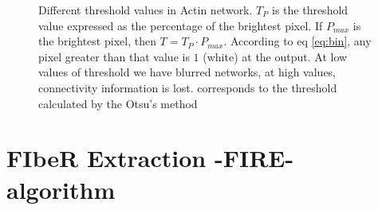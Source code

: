 \begin{figure}[h]
\begin{minipage}{0.55\textwidth}
\hspace{1pt}
\end{minipage}
% 
% 
\caption[Different threshold values on networks]{Different threshold values in
Actin network.
$T_P$ is the threshold value expressed as the percentage of the brightest pixel. If
$P_{max}$ is the brightest pixel, then $T=T_P\cdot P_{max}$. According to eq \ref{eq:bin}, any pixel greater than
that value is $1$ (white) at the output. At low values of threshold we have
blurred networks, at high values, connectivity information is lost.
 corresponds to the threshold calculated by the Otsu's method }
\label{fig:binary}
\end{figure}

 
\section{FIbeR Extraction -FIRE- algorithm}

